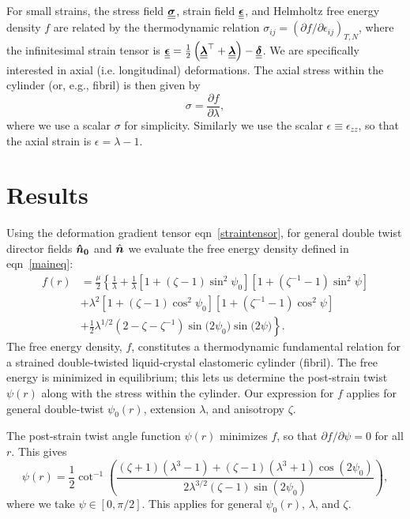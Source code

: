 \documentclass[twoside,twocolumn,9pt]{article}
\begin{document}
For small strains, the stress field $\boldsymbol{\underline{\underline{\sigma}}}$, strain field $\boldsymbol{\underline{\underline{\epsilon}}}$, and Helmholtz free energy density $f$ are related by the thermodynamic relation \cite{Landau:1960}    $ \sigma_{ij} = \left( {\partial f}/{\partial \epsilon_{ij}}\right)_{T,N}$,
where the infinitesimal strain tensor is $\boldsymbol{\underline{\underline{\epsilon}}} = \frac{1}{2} \left( \boldsymbol{\underline{\underline{\lambda}}}^\top + \boldsymbol{\underline{\underline{\lambda}}}\right) - \boldsymbol{\underline{\underline{\delta}}}$.  We are specifically interested in axial (i.e. longitudinal) deformations. The axial stress within the cylinder (or, e.g., fibril) is then given by
\begin{equation} \label{stress}
\sigma = \frac{\partial f}{\partial \lambda},
\end{equation}
where we use a scalar $\sigma$ for simplicity. Similarly we use the scalar $\epsilon \equiv \epsilon_{zz}$, so that the axial strain is $\epsilon = \lambda-1$.

\section{Results}
Using the deformation gradient tensor eqn~\eqref{straintensor}, for general double twist director fields ${\boldsymbol{\hat{n}_0}}$ and $\hat{\boldsymbol{n}}$ we evaluate the free energy density defined in eqn~\eqref{maineq}:
\begin{equation}\label{expanded}
\begin{aligned}
f(r) & = \frac{\mu}{2} \left\{\frac{1}{\lambda}  + \frac{1}{\lambda} [1 + (\zeta-1) \sin^2\psi_0] [1 + (\zeta^{-1}-1) \sin^2\psi] \right.\\
& + \lambda^2 [1 + (\zeta-1) \cos^2\psi_0]  [1 + (\zeta^{-1}-1) \cos^2\psi]\\
&  \left.+ \frac{1}{2} \lambda^{1/2} (2  -\zeta - \zeta^{-1})\sin\big(2\psi_0\big)\sin\big(2\psi\big)\right\}.
\end{aligned}
\end{equation}
The free energy density, $f$, constitutes a thermodynamic fundamental relation for a strained double-twisted liquid-crystal elastomeric cylinder (fibril). The free energy is minimized in equilibrium; this lets us determine the post-strain twist $\psi(r)$ along with the stress within the cylinder.  Our expression for $f$ applies for general double-twist $\psi_0(r)$, extension $\lambda$, and anisotropy $\zeta$. 

The post-strain twist angle function $\psi(r)$ minimizes $f$, so that $\partial f / \partial \psi=0$ for all $r$. This gives
\begin{equation}\label{psieq}
\psi(r) = \frac{1}{2}\cot^{-1}\left( \frac{ (\zeta+1)(\lambda^3-1) + (\zeta-1)(\lambda^3+1)\cos(2\psi_0)}{2\lambda^{3/2}(\zeta-1)\sin(2\psi_0)} \right),
\end{equation}
where we take $\psi\in[0,\pi/2]$. This applies for general $\psi_0(r)$,  $\lambda$, and  $\zeta$.
\end{document}
